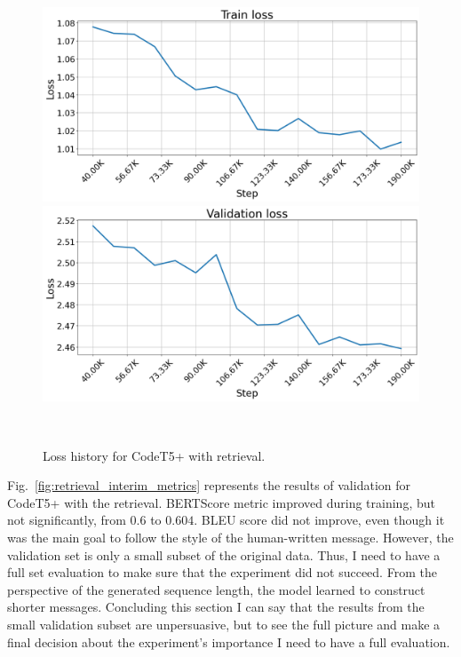 \begin{figure}[H]
    \centering
    \includegraphics[scale=0.4]{figs/retrieval_Train loss.png}
    \includegraphics[scale=0.4]{figs/retrieval_Validation loss.png}
    \caption{Loss history for CodeT5+ with retrieval.}
    ~\label{fig:retrieval_loss_hist}
\end{figure}
Fig.~\ref{fig:retrieval_interim_metrics} represents the results of validation for CodeT5+ with the retrieval. BERTScore metric improved during training, but not significantly, from $0.6$ to $0.604$. BLEU score did not improve, even though it was the main goal to follow the style of the human-written message. However, the validation set is only a small subset of the original data. Thus, I need to have a full set evaluation to make sure that the experiment did not succeed. From the perspective of the generated sequence length, the model learned to construct shorter messages. Concluding this section I can say that the results from the small validation subset are unpersuasive, but to see the full picture and make a final decision about the experiment's importance I need to have a full evaluation.  
